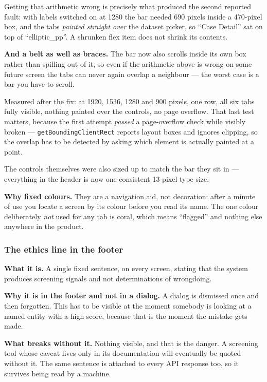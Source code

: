 \documentclass[11pt,a4paper]{article}
\newcommand{\code}[1]{\texttt{\small #1}}
\begin{document}
\begin{plain}
Getting that arithmetic wrong is precisely what produced the second reported
fault: with labels switched on at 1280 the bar needed 690 pixels inside a
470-pixel box, and the tabs \emph{painted straight over} the dataset picker, so
``Case Detail'' sat on top of ``elliptic\_pp''. A shrunken flex item does not
shrink its contents.

\begin{plain}
\textbf{And a belt as well as braces.} The bar now also scrolls inside its own
box rather than spilling out of it, so even if the arithmetic above is wrong on
some future screen the tabs can never again overlap a neighbour --- the worst
case is a bar you have to scroll.

Measured after the fix: at 1920, 1536, 1280 and 900 pixels, one row, all six
tabs fully visible, nothing painted over the controls, no page overflow. That
last test matters, because the first attempt \emph{passed} a page-overflow check
while visibly broken --- \code{getBoundingClientRect} reports layout boxes and
ignores clipping, so the overlap has to be detected by asking which element is
actually painted at a point.
\end{plain}

The controls themselves were also sized up to match the bar they sit in ---
everything in the header is now one consistent 13-pixel type size.
\end{plain}

\textbf{Why fixed colours.} They are a navigation aid, not decoration: after a
minute of use you locate a screen by its colour before you read its name. The
one colour deliberately \emph{not} used for any tab is coral, which means
``flagged'' and nothing else anywhere in the product.

\subsubsection*{The ethics line in the footer}

\textbf{What it is.} A single fixed sentence, on every screen, stating that the
system produces screening signals and not determinations of wrongdoing.

\textbf{Why it is in the footer and not in a dialog.} A dialog is dismissed once
and then forgotten. This has to be visible at the moment somebody is looking at
a named entity with a high score, because that is the moment the mistake gets
made.

\textbf{What breaks without it.} Nothing visible, and that is the danger. A
screening tool whose caveat lives only in its documentation will eventually be
quoted without it. The same sentence is attached to every API response too, so
it survives being read by a machine.
\end{document}
